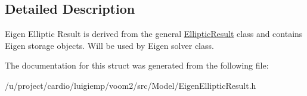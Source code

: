 \subsection{Detailed Description}
Eigen Elliptic Result is derived from the general \hyperlink{structvoom_1_1_elliptic_result}{EllipticResult} class and contains Eigen storage objects. Will be used by Eigen solver class. 

The documentation for this struct was generated from the following file:\begin{DoxyCompactItemize}
\item 
/u/project/cardio/luigiemp/voom2/src/Model/EigenEllipticResult.h\end{DoxyCompactItemize}
